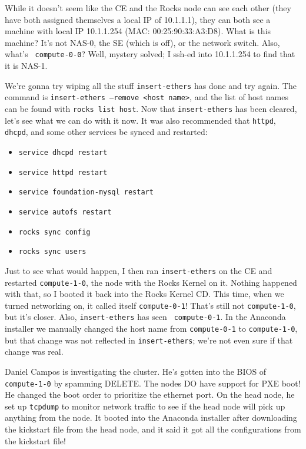\documentclass[12pt]{article}
\begin{document}
\qq While it doesn't seem like the CE and the Rocks node can see each other
(they have both assigned themselves a local IP of 10.1.1.1), they can both see a
machine with local IP 10.1.1.254 (MAC: 00:25:90:33:A3:D8). What is this machine?
It's not NAS-0, the SE (which is off), or the network switch. Also, what's {\tt
  compute-0-0}? Well, mystery solved; I ssh-ed into 10.1.1.254 to find that it
is NAS-1.

\qq We're gonna try wiping all the stuff {\tt insert-ethers} has done and try
again. The command is {\tt insert-ethers --remove <host name>}, and the list of
host names can be found with {\tt rocks list host}. Now that {\tt insert-ethers}
has been cleared, let's see what we can do with it now. It was also recommended
that {\tt httpd}, {\tt dhcpd}, and some other services be synced and restarted:

\begin{itemize}
\item {\tt service dhcpd restart}
\item {\tt service httpd restart}
\item {\tt service foundation-mysql restart}
\item {\tt service autofs restart}
\item {\tt rocks sync config}
\item {\tt rocks sync users}
\end{itemize}

Just to see what would happen, I then ran {\tt insert-ethers} on the CE and
restarted {\tt compute-1-0}, the node with the Rocks Kernel on it. Nothing
happened with that, so I booted it back into the Rocks Kernel CD. This time,
when we turned networking on, it called itself {\tt compute-0-1}! That's still
not {\tt compute-1-0}, but it's closer. Also, {\tt insert-ethers} has seen {\tt
  compute-0-1}. In the Anaconda installer we manually changed the host name from
{\tt compute-0-1} to {\tt compute-1-0}, but that change was not reflected in
{\tt insert-ethers}; we're not even sure if that change was real.

\begin{tcolorbox}[title=RESOLUTION, colback=white, colframe=green!40!black]
Daniel Campos is investigating the cluster. He's gotten into the BIOS of
{\tt compute-1-0} by spamming DELETE. The nodes DO have support for
PXE boot! He changed the boot order to prioritize the ethernet port. On the head
node, he set up {\tt tcpdump} to monitor network traffic to see if the head node
will pick up anything from the node. It booted into the Anaconda installer after
downloading the kickstart file from the head node, and it said it got all the
configurations from the kickstart file!
\end{tcolorbox}
\end{document}
